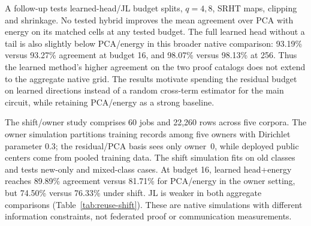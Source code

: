 \documentclass[5p,times,twocolumn]{elsarticle}
\theoremstyle{plain}
\theoremstyle{definition}
\theoremstyle{remark}
\begin{document}
\par\endgroup


\begingroup\color{RevisionGreen}
A follow-up tests learned-head/JL budget splits, $q=4,8$, SRHT maps, clipping and shrinkage. No tested hybrid improves the mean agreement over PCA with energy on its matched cells at any tested budget. The full learned head without a tail is also slightly below PCA/energy in this broader native comparison: 93.19\% versus 93.27\% agreement at budget 16, and 98.07\% versus 98.13\% at 256. Thus the learned method's higher agreement on the two proof catalogs does not extend to the aggregate native grid. The results motivate spending the residual budget on learned directions instead of a random cross-term estimator for the main circuit, while retaining PCA/energy as a strong baseline.


\par\endgroup
\begingroup\color{RevisionGreen}
The shift/owner study comprises 60 jobs and 22,260 rows across five corpora. The owner simulation partitions training records among five owners with Dirichlet parameter 0.3; the residual/PCA basis sees only owner~0, while deployed public centers come from pooled training data. The shift simulation fits on old classes and tests new-only and mixed-class cases. At budget 16, learned head+energy reaches 89.89\% agreement versus 81.71\% for PCA/energy in the owner setting, but 74.50\% versus 76.33\% under shift. JL is weaker in both aggregate comparisons (Table~\ref{tab:reuse-shift}). These are native simulations with different information constraints, not federated proof or communication measurements.
\end{document}
